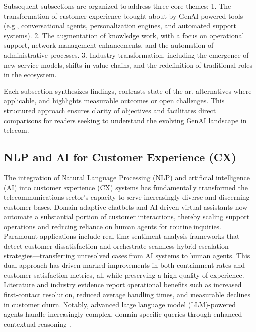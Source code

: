 \documentclass[sigconf]{acmart}
\begin{document}
Subsequent subsections are organized to address three core themes:
1. The transformation of customer experience brought about by GenAI-powered tools (e.g., conversational agents, personalization engines, and automated support systems).
2. The augmentation of knowledge work, with a focus on operational support, network management enhancements, and the automation of administrative processes.
3. Industry transformation, including the emergence of new service models, shifts in value chains, and the redefinition of traditional roles in the ecosystem.

Each subsection synthesizes findings, contrasts state-of-the-art alternatives where applicable, and highlights measurable outcomes or open challenges. This structured approach ensures clarity of objectives and facilitates direct comparisons for readers seeking to understand the evolving GenAI landscape in telecom.

\subsection{NLP and AI for Customer Experience (CX)}

The integration of Natural Language Processing (NLP) and artificial intelligence (AI) into customer experience (CX) systems has fundamentally transformed the telecommunications sector’s capacity to serve increasingly diverse and discerning customer bases. Domain-adaptive chatbots and AI-driven virtual assistants now automate a substantial portion of customer interactions, thereby scaling support operations and reducing reliance on human agents for routine inquiries. Paramount applications include real-time sentiment analysis frameworks that detect customer dissatisfaction and orchestrate seamless hybrid escalation strategies—transferring unresolved cases from AI systems to human agents. This dual approach has driven marked improvements in both containment rates and customer satisfaction metrics, all while preserving a high quality of experience. Literature and industry evidence report operational benefits such as increased first-contact resolution, reduced average handling times, and measurable declines in customer churn. Notably, advanced large language model (LLM)-powered agents handle increasingly complex, domain-specific queries through enhanced contextual reasoning~\cite{ref18}.
\end{document}
